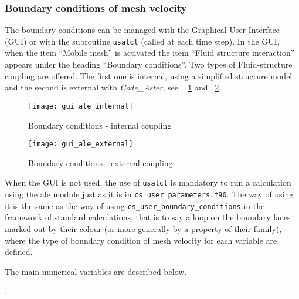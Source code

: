 {{\subsubsection{Boundary conditions of mesh velocity}
The boundary conditions can be managed with the Graphical User Interface (GUI)
 or with the subroutine \texttt{usalcl} (called at each time step). In the GUI,
 when the item ``Mobile mesh'' is activated  the item ``Fluid structure interaction''
 appears under the heading ``Boundary conditions''. Two types of Fluid-structure
 coupling are offered. The first one is internal, using a simplified structure
 model and the second is external with \textit{Code\_Aster}, see \figurename~
 \ref{fig:CL-ale1} and \figurename~\ref{fig:CL-ale2}.
%
\begin{figure}[ht]
\begin{center}
\texttt{[image: gui\_ale\_internal]}
\caption{Boundary conditions - internal coupling}
\label{fig:CL-ale1}
\end{center}
\end{figure}
%
\begin{figure}[ht]
\begin{center}
\texttt{[image: gui\_ale\_external]}
\caption{Boundary conditions - external coupling}
\label{fig:CL-ale2}
\end{center}
\end{figure}

When the GUI is not used, the use of \texttt{usalcl} is mandatory to run
 a calculation using
the ale module just as it is in \texttt{cs\_user\_parameters.f90}. The way of using it
is the same as the way of using \texttt{cs\_user\_boundary\_conditions} in the framework of
standard calculations, that is to say a loop on the boundary faces
marked out by their colour (or more generally by a property of their
family), where the type of boundary condition of mesh velocity for
each variable are defined.

The main numerical variables are described below.

.

}}
